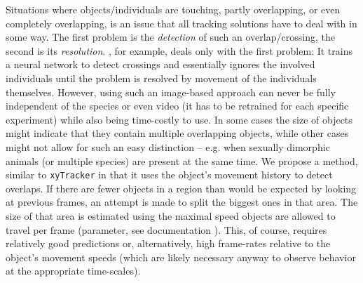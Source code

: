 \documentclass[9pt,lineno]{elife}
\newcommand{\idtracker}{\protect\path{ idtracker.ai}}
\newcommand{\TRex}{\protect\path{TRex}}
\begin{document}


Situations where objects/individuals are touching, partly overlapping, or even completely overlapping, is an issue that all tracking solutions have to deal with in some way. The first problem is the \textit{detection} of such an overlap/crossing, the second is its \textit{resolution}. \idtracker{}, for example, deals only with the first problem: It trains a neural network to detect crossings and essentially ignores the involved individuals until the problem is resolved by movement of the individuals themselves. However, using such an image-based approach can never be fully independent of the species or even video (it has to be retrained for each specific experiment) while also being time-costly to use. In some cases the size of objects might indicate that they contain multiple overlapping objects, while other cases might not allow for such an easy distinction -- e.g. when sexually dimorphic animals (or multiple species) are present at the same time. We propose a method, similar to \verb!xyTracker! in that it uses the object's movement history to detect overlaps. If there are fewer objects in a region than would be expected by looking at previous frames, an attempt is made to split the biggest ones in that area. The size of that area is estimated using the maximal speed objects are allowed to travel per frame (parameter, see documentation \protect{}). This, of course, requires relatively good predictions or, alternatively, high frame-rates relative to the object's movement speeds (which are likely necessary anyway to observe behavior at the appropriate time-scales).
\end{document}

